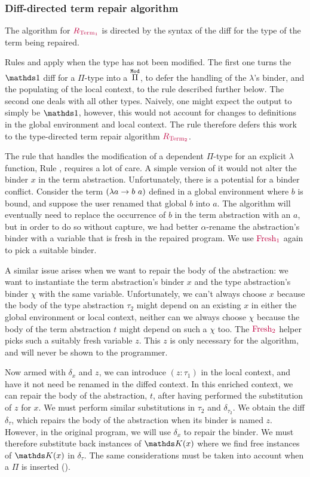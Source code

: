 \subsubsection*{Diff-directed term repair algorithm}

The algorithm for $\textcolor{purple}{R_{\text{Term}_1}}$ is directed by the syntax of the diff for
the type of the term being repaired.

Rules  and  apply when the type has not
been modified.  The first one turns the $\MathSame$ diff for a $\Pi$-type into a
$\overset{\mathtt{Mod}}{\Pi}$, to defer the handling of the $\lambda$'s binder, and the
populating of the local context, to the rule  described
further below.  The second one deals with all other types.  Naively, one might
expect the output to simply be $\MathSame$, however, this would not account for
changes to definitions in the global environment and local context.  The rule
therefore defers this work to the type-directed term repair algorithm
$\textcolor{purple}{R_{\text{Term}_2}}$.

The rule that handles the modification of a dependent $\Pi$-type for an explicit
$\lambda$ function, Rule , requires a lot of care.  A simple
version of it would not alter the binder $x$ in the term abstraction.
Unfortunately, there is a potential for a binder conflict.  Consider the term
$({\lambda} {a} \rightarrow b\ a)$ defined in a global environment where $b$ is bound, and
suppose the user renamed that global $b$ into $a$.  The algorithm will
eventually need to replace the occurrence of $b$ in the term abstraction with an
$a$, but in order to do so without capture, we had better $\alpha$-rename the
abstraction's binder with a variable that is fresh in the repaired program.  We
use $\textcolor{purple}{\text{Fresh}_1}$ again to pick a suitable binder.

A similar issue arises when we want to repair the body of the abstraction: we
want to instantiate the term abstraction's binder $x$ and the type abstraction's
binder $\chi$ with the same variable.  Unfortunately, we can't always choose $x$
because the body of the type abstraction $\tau_2$ might depend on an existing
$x$ in either the global environment or local context, neither can we always
choose $\chi$ because the body of the term abstraction $t$ might depend on such
a $\chi$ too.  The $\textcolor{purple}{\text{Fresh}_2}$ helper picks such a suitably fresh variable
$z$.  This $z$ is only necessary for the algorithm, and will never be shown to
the programmer.

Now armed with $\delta_x$ and $z$, we can introduce $(z : \tau_1)$ in the local
context, and have it not need be renamed in the diffed context.  In this
enriched context, we can repair the body of the abstraction, $t$, after having
performed the substitution of $z$ for $x$.  We must perform similar
substitutions in $\tau_2$ and $\delta_{\tau_2}$.  We obtain the diff
$\delta_\tau$, which repairs the body of the abstraction when its binder is
named $z$.  However, in the original program, we will use $\delta_x$ to repair
the binder.  We must therefore substitute back instances of $\MathReplace{x}$
where we find free instances of $\MathReplace{x}$ in $\delta_\tau$.  The same
considerations must be taken into account when a $\Pi$ is inserted
().

